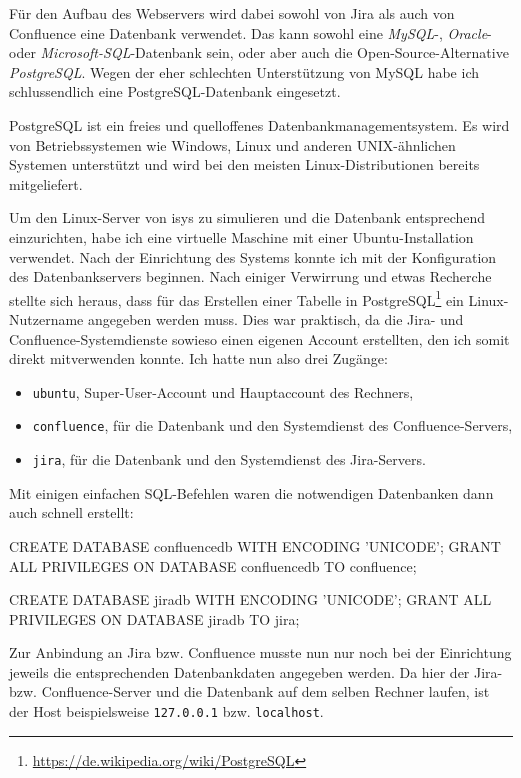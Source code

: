 Für den Aufbau des Webservers wird dabei sowohl von Jira als auch von Confluence
eine Datenbank verwendet. Das kann sowohl eine \textit{MySQL}-, \textit{Oracle}-
oder \textit{Microsoft-SQL}-Datenbank sein, oder aber auch die Open-Source-Alternative
\textit{PostgreSQL}. Wegen der eher schlechten Unterstützung von MySQL habe ich
schlussendlich eine PostgreSQL-Datenbank eingesetzt.

PostgreSQL ist ein freies und quelloffenes Datenbankmanagementsystem. Es wird von
Betriebssystemen wie Windows, Linux und anderen UNIX-ähnlichen Systemen unterstützt
und wird bei den meisten Linux-Distributionen bereits mitgeliefert.

Um den Linux-Server von isys zu simulieren und die Datenbank entsprechend einzurichten,
habe ich eine virtuelle Maschine mit einer Ubuntu-Installation verwendet. Nach der
Einrichtung des Systems konnte ich mit der Konfiguration des Datenbankservers beginnen.
Nach einiger Verwirrung und etwas Recherche stellte sich heraus, dass für das Erstellen
einer Tabelle in PostgreSQL\footnote{\url{https://de.wikipedia.org/wiki/PostgreSQL}} ein Linux-Nutzername angegeben werden muss. Dies war
praktisch, da die Jira- und Confluence-Systemdienste sowieso einen eigenen Account
erstellten, den ich somit direkt mitverwenden konnte. Ich hatte nun also drei Zugänge:

\begin{itemize}
	\item \texttt{ubuntu}, Super-User-Account und Hauptaccount des Rechners,
	\item \texttt{confluence}, für die Datenbank und den Systemdienst des Confluence-Servers,
	\item \texttt{jira}, für die Datenbank und den Systemdienst des Jira-Servers.
\end{itemize}

Mit einigen einfachen SQL-Befehlen waren die notwendigen Datenbanken dann auch schnell
erstellt:

\begin{code}[language=SQL, caption={SQL-Befehle zur Erstellung der Datenbanken}, label={lst:jira-database}]
CREATE DATABASE confluencedb WITH ENCODING 'UNICODE';
GRANT ALL PRIVILEGES ON DATABASE confluencedb TO confluence;

CREATE DATABASE jiradb WITH ENCODING 'UNICODE';
GRANT ALL PRIVILEGES ON DATABASE jiradb TO jira;
\end{code}

Zur Anbindung an Jira bzw. Confluence musste nun nur noch bei der Einrichtung jeweils
die entsprechenden Datenbankdaten angegeben werden. Da hier der Jira- bzw. Confluence-Server
und die Datenbank auf dem selben Rechner laufen, ist der Host beispielsweise \texttt{127.0.0.1}
bzw. \texttt{localhost}.

